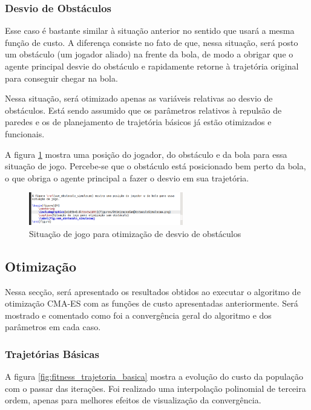 \documentclass[a4paper,12pt]{article}
\begin{document}
\subsubsection{Desvio de Obstáculos}

Esse caso é bastante similar à situação anterior no sentido que usará a mesma função de custo. A diferença consiste no fato de que, nessa situação, será posto um obstáculo (um jogador aliado) na frente da bola, de modo a obrigar que o agente principal desvie do obstáculo e rapidamente retorne à trajetória original para conseguir chegar na bola.

Nessa situação, será otimizado apenas as variáveis relativas ao desvio de obstáculos. Está sendo assumido que os parâmetros relativos à repulsão de paredes e os de planejamento de trajetória básicos já estão otimizados e funcionais.

A figura \ref{fig:com_obstaculo_simulacao} mostra uma posição do jogador, do obstáculo e da bola para essa situação de jogo. Percebe-se que o obstáculo está posicionado bem perto da bola, o que obriga o agente principal a fazer o desvio em sua trajetória.

\begin{figure}[H]
	\centering
	\includegraphics[width=0.6\textwidth]{figures/OtimizacaoComObstaculoSimulacao.png}
	\caption{Situação de jogo para otimização de desvio de obstáculos}
	\label{fig:com_obstaculo_simulacao}
\end{figure}


\subsection{Otimização}

Nessa secção, será apresentado os resultados obtidos ao executar o algoritmo de otimização CMA-ES com as funções de custo apresentadas anteriormente. Será mostrado e comentado como foi a convergência geral do algoritmo e dos parâmetros em cada caso.

\subsubsection{Trajetórias Básicas}

A figura \ref{fig:fitness_trajetoria_basica} mostra a evolução do custo da população com o passar das iterações. Foi realizado uma interpolação polinomial de terceira ordem, apenas para melhores efeitos de visualização da convergência.
\end{document}
